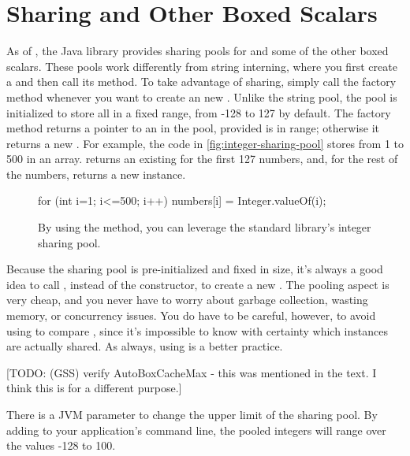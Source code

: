 \section{Sharing  and Other Boxed Scalars}

As of \javafive, the Java library provides sharing pools for
 and some of the other boxed scalars. These pools work
differently from string interning, where you first create a  and
then call its  method.  To take advantage of 
sharing, simply call the factory method 
whenever you want to create an new . Unlike the string pool, the 
pool is initialized to store all  in a fixed range, from -128 to 127 by
default. The factory method returns a
pointer to an  in the pool, provided  is in
range; otherwise it returns a new . For example,
the code in \autoref{fig:integer-sharing-pool} stores  from 1 to
500 in an array.
 returns an existing 
for the first 127 numbers, and, for the rest of the numbers, 
returns a new  instance.

\begin{figure}
\centering
\begin{framedlisting}
for (int i=1; i<=500; i++) {
 numbers[i] = Integer.valueOf(i);
}
\end{framedlisting}
\caption{By using the  method, you can leverage the standard
library's integer sharing pool.}
\label{fig:integer-sharing-pool}
\end{figure}

Because the  sharing pool is pre-initialized and fixed in size,
it's always a good idea to call , instead of the
constructor, to create a new . The pooling aspect is very
cheap, and you never have to worry about garbage collection, wasting memory, or concurrency issues.
You do have to be careful, however, to avoid using \code{==} to compare
, since it's impossible to know with certainty which instances
are actually shared.  As always, using  is a better practice.

[TODO: (GSS) verify AutoBoxCacheMax - this was mentioned in the text. I
think this is for a different purpose.]

There is a JVM parameter to change the upper limit of the 
sharing pool. By adding  to your
application's command line, the pooled integers will range over the values -128
to 100.

